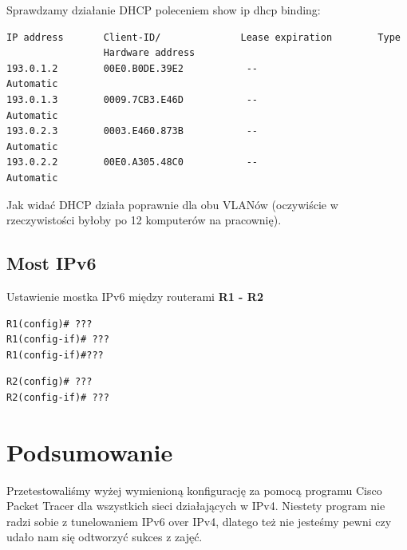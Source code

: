 \documentclass[11pt,a4paper]{article}
\begin{document}
Sprawdzamy działanie DHCP poleceniem show ip dhcp binding:
\begin{lstlisting}
IP address       Client-ID/              Lease expiration        Type
                 Hardware address
193.0.1.2        00E0.B0DE.39E2           --                     Automatic
193.0.1.3        0009.7CB3.E46D           --                     Automatic
193.0.2.3        0003.E460.873B           --                     Automatic
193.0.2.2        00E0.A305.48C0           --                     Automatic
\end{lstlisting}
Jak widać DHCP działa poprawnie dla obu VLANów (oczywiście w rzeczywistości byłoby po 12 komputerów na pracownię).

\subsection{Most IPv6}

\noindent
Ustawienie mostka IPv6 między routerami {\bf R1 - R2}
\begin{lstlisting}
R1(config)# ???
R1(config-if)# ???
R1(config-if)#???
\end{lstlisting}

\begin{lstlisting}
R2(config)# ???
R2(config-if)# ???
\end{lstlisting}

\section{Podsumowanie}
Przetestowaliśmy wyżej wymienioną konfigurację za pomocą programu Cisco Packet Tracer dla wszystkich sieci działających w IPv4. Niestety program nie radzi sobie z tunelowaniem IPv6 over IPv4, dlatego też nie jesteśmy pewni czy udało nam się odtworzyć sukces z zajęć. 
\end{document}
